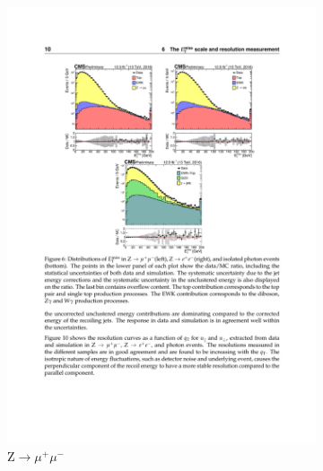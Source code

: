 \begin{figure}[!htb]
        \quad
        \begin{subfigure}[t]{0.31\textwidth}
          \includegraphics[width=\textwidth]{figures/met_resolution_zmm.pdf}
          \caption{Z$\to \mu^+ \mu^-$}
          \label{fig:met_resolution_zmm}
        \end{subfigure}
        \quad
        \begin{subfigure}[t]{0.31\textwidth}

\end{subfigure}
\end{figure}
